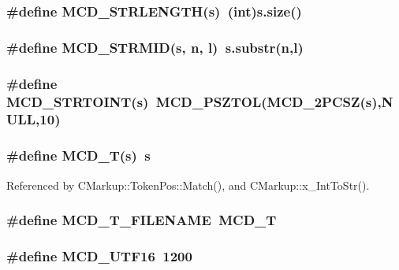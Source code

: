 \subsubsection[MCD\_\-STRLENGTH]{\setlength{\rightskip}{0pt plus 5cm}\#define MCD\_\-STRLENGTH(s)~(int)s.size()}\label{Markup_8h_0cf539be69b737a377b5ba5080febc17}


\subsubsection[MCD\_\-STRMID]{\setlength{\rightskip}{0pt plus 5cm}\#define MCD\_\-STRMID(s, \/  n, \/  l)~s.substr(n,l)}\label{Markup_8h_9ac43f7dfd3f9b4a40fa2975a4289037}


\subsubsection[MCD\_\-STRTOINT]{\setlength{\rightskip}{0pt plus 5cm}\#define MCD\_\-STRTOINT(s)~MCD\_\-PSZTOL(MCD\_\-2PCSZ(s),NULL,10)}\label{Markup_8h_d943bd4174ba98a10524bc437d0c0d50}


\subsubsection[MCD\_\-T]{\setlength{\rightskip}{0pt plus 5cm}\#define MCD\_\-T(s)~s}\label{Markup_8h_3717b2fa88d73f5f346ec6efdfbe2032}




Referenced by CMarkup::TokenPos::Match(), and CMarkup::x\_\-IntToStr().
\subsubsection[MCD\_\-T\_\-FILENAME]{\setlength{\rightskip}{0pt plus 5cm}\#define MCD\_\-T\_\-FILENAME~MCD\_\-T}\label{Markup_8h_c5dd80c2be80f6331999ca42ba047aca}


\subsubsection[MCD\_\-UTF16]{\setlength{\rightskip}{0pt plus 5cm}\#define MCD\_\-UTF16~1200}\label{Markup_8h_d9263b419662458249b697e27f9af6ee}


